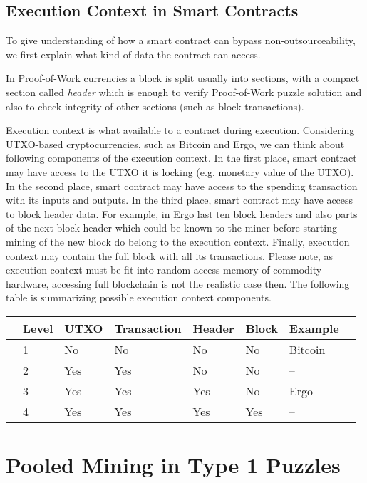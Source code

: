 \documentclass[11pt]{article}
\begin{document}
\subsection{Execution Context in Smart Contracts}

To give understanding of how a smart contract can bypass non-outsourceability, we first explain what kind of data the contract
can access.

In Proof-of-Work currencies a block is split usually into sections, with a compact section called {\em header} which is
enough to verify Proof-of-Work puzzle solution and also to check integrity of other sections (such as block transactions).

Execution context is what available to a contract during execution. Considering UTXO-based cryptocurrencies, such as
Bitcoin and Ergo, we can think about following components of the execution context. In the first place, smart contract
 may have access to the UTXO it is locking (e.g. monetary value of the UTXO). In the second place, smart contract may
 have access to the spending transaction with its inputs and outputs. In the third place, smart contract may have access
 to block header data. For example, in Ergo last ten block headers and also parts of the next block header which could
 be known to the miner before starting mining of the new block do belong to the execution context. Finally, execution
 context may contain the full block with all its transactions. Please note, as execution context must be fit into
 random-access memory of commodity hardware, accessing full blockchain is not the realistic case then. The following
 table is summarizing possible execution context components.

\begin{tabular}{llllllll}
	& Level & UTXO & Transaction & Header      & Block & Example \\ \hline
	& 1     & No  & No          & No  		   & No    & Bitcoin \\
	& 2     & Yes & Yes         & No 		   & No    & -- \\
	& 3     & Yes & Yes         & Yes 		   & No    & Ergo    \\
	& 4     & Yes & Yes         & Yes 		   & Yes   & --    \\
\end{tabular}
	
\section{Pooled Mining in Type 1 Puzzles}
\end{document}
